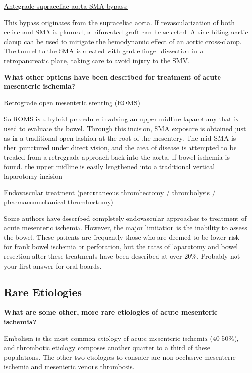 \documentclass[
]{book}
\begin{document}
\underline{Antegrade supraceliac aorta-SMA bypass:}

This bypass originates from the supraceliac aorta. If revascularization
of both celiac and SMA is planned, a bifurcated graft can be selected. A
side-biting aortic clamp can be used to mitigate the hemodynamic effect
of an aortic cross-clamp. The tunnel to the SMA is created with gentle
finger dissection in a retropancreatic plane, taking care to avoid
injury to the SMV.

\textbf{What other options have been described for treatment of acute
mesenteric ischemia?}

\underline{Retrograde open mesenteric stenting (ROMS)}

So ROMS is a hybrid procedure involving an upper midline laparotomy that
is used to evaluate the bowel. Through this incision, SMA exposure is
obtained just as in a traditional open fashion at the root of the
mesentery. The mid-SMA is then punctured under direct vision, and the
area of disease is attempted to be treated from a retrograde approach
back into the aorta. If bowel ischemia is found, the upper midline is
easily lengthened into a traditional vertical laparotomy incision.

\underline{Endovascular treatment (percutaneous thrombectomy / thrombolysis /
pharmacomechanical thrombectomy)}

Some authors have described completely endovascular approaches to
treatment of acute mesenteric ischemia. However, the major limitation is
the inability to assess the bowel. These patients are frequently those
who are deemed to be lower-risk for frank bowel ischemia or perforation,
but the rates of laparotomy and bowel resection after these treatments
have been described at over 20\%. Probably not your first answer for oral
boards.

\hypertarget{rare-etiologies}{%
\subsection{Rare Etiologies}\label{rare-etiologies}}

\textbf{What are some other, more rare etiologies of acute mesenteric
ischemia?}

Embolism is the most common etiology of acute mesenteric ischemia
(40-50\%), and thrombotic etiology composes another quarter to a third of
these populations. The other two etiologies to consider are
non-occlusive mesenteric ischemia and mesenteric venous thrombosis.
\end{document}

